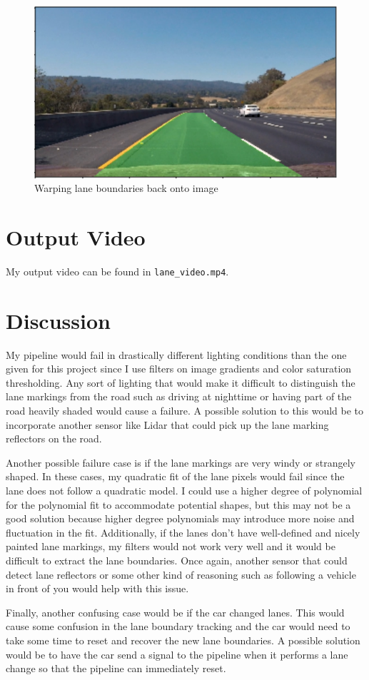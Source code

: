 \documentclass[12pt]{article}
\begin{document}
\begin{figure}[h]
\centering
\includegraphics[scale=1]{lane_test.png}
\caption{Warping lane boundaries back onto image}
\label{fig:lane_plot}
\end{figure}

\section{Output Video}
My output video can be found in \texttt{lane\_video.mp4}.

\section{Discussion}
My pipeline would fail in drastically different lighting conditions than the one given for this project since I use filters on image gradients and color saturation thresholding. Any sort of lighting that would make it difficult to distinguish the lane markings from the road such as driving at nighttime or having part of the road heavily shaded would cause a failure. A possible solution to this would be to incorporate another sensor like Lidar that could pick up the lane marking reflectors on the road.

Another possible failure case is if the lane markings are very windy or strangely shaped. In these cases, my quadratic fit of the lane pixels would fail since the lane does not follow a quadratic model. I could use a higher degree of polynomial for the polynomial fit to accommodate potential shapes, but this may not be a good solution because higher degree polynomials may introduce more noise and fluctuation in the fit. Additionally, if the lanes don't have well-defined and nicely painted lane markings, my filters would not work very well and it would be difficult to extract the lane boundaries. Once again, another sensor that could detect lane reflectors or some other kind of reasoning such as following a vehicle in front of you would help with this issue.

Finally, another confusing case would be if the car changed lanes. This would cause some confusion in the lane boundary tracking and the car would need to take some time to reset and recover the new lane boundaries. A possible solution would be to have the car send a signal to the pipeline when it performs a lane change so that the pipeline can immediately reset. 
 
\end{document}

